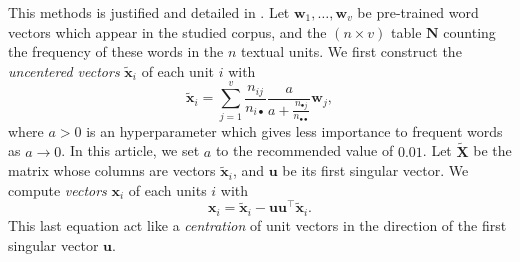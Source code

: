 \documentclass[
twocolumn,
]{ceurart}
\begin{document}
This methods is justified and detailed in \cite{Arora2017}. Let $\mathbf{w}_1, \ldots, \mathbf{w}_v$ be pre-trained word vectors which appear in the studied corpus, and the $(n \times v)$ table $\mathbf{N}$ counting the frequency of these words in the $n$ textual units. We first construct the \emph{uncentered vectors} $\widetilde{\mathbf{x}}_i$ of each unit $i$ with
\begin{equation}
\widetilde{\mathbf{x}}_i = \sum_{j = 1}^v \frac{n_{ij}}{n_{i \bullet}} \frac{a}{a + \frac{n_{\bullet j}}{n_{\bullet \bullet}}} \mathbf{w}_j,
\end{equation}
where $a > 0$ is an hyperparameter which gives less importance to frequent words as $a \to 0$. In this article, we set $a$ to the recommended value of $0.01$. Let $\widetilde{\mathbf{X}}$ be the matrix whose columns are vectors $\widetilde{\mathbf{x}}_i$, and $\mathbf{u}$ be its first singular vector. We compute \emph{vectors} $\mathbf{x}_i$ of each units $i$ with
\begin{equation}
\mathbf{x}_i = \widetilde{\mathbf{x}}_i - \mathbf{u}\mathbf{u}^\top \widetilde{\mathbf{x}}_i.
\end{equation}
This last equation act like a \emph{centration} of unit vectors in the direction of the first singular vector $\mathbf{u}$.



\end{document}
